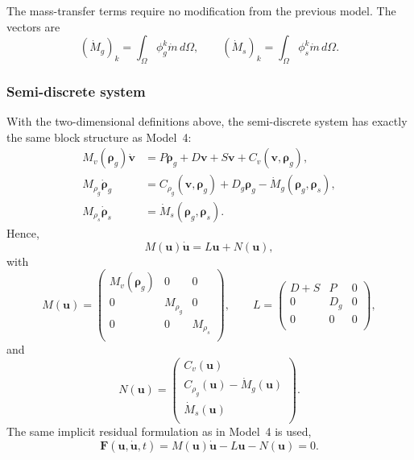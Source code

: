 The mass-transfer terms require no modification from the previous model. The vectors are
\begin{equation}
(\dot M_g)_{k}=\int_\Omega\phi_g^k\dot m\,d\Omega,\qquad
(\dot M_s)_{k}=\int_\Omega\phi_s^k\dot m\,d\Omega.
\end{equation}

\subsubsection{Semi-discrete system}

With the two-dimensional definitions above, the semi-discrete system has exactly the same block structure as Model~4:
\begin{subequations}\label{eq:model5_semidis}
\begin{align}
M_v(\boldsymbol\rho_g)\dot{\mathbf v}
&=P\boldsymbol\rho_g+D\mathbf v+S\mathbf v+C_v(\mathbf v,\boldsymbol\rho_g),\\
M_{\rho_g}\dot{\boldsymbol\rho}_g
&=C_{\rho_g}(\mathbf v,\boldsymbol\rho_g)+D_g\boldsymbol\rho_g-\dot M_g(\boldsymbol\rho_g,\boldsymbol\rho_s),\\
M_{\rho_s}\dot{\boldsymbol\rho}_s
&=\dot M_s(\boldsymbol\rho_g,\boldsymbol\rho_s).
\end{align}
\end{subequations}
Hence,
\begin{equation}
M(\mathbf u)\dot{\mathbf u}=L\mathbf u+N(\mathbf u),
\end{equation}
with
\begin{equation}
M(\mathbf u)=
\begin{pmatrix}
M_v(\boldsymbol\rho_g)&0&0\\
0&M_{\rho_g}&0\\
0&0&M_{\rho_s}\\
\end{pmatrix},
\qquad
L=
\begin{pmatrix}
D+S&P&0\\
0&D_g&0\\
0&0&0\\
\end{pmatrix},
\end{equation}
and
\begin{equation}
N(\mathbf u)=
\begin{pmatrix}
C_v(\mathbf u)\\
C_{\rho_g}(\mathbf u)-\dot M_g(\mathbf u)\\
\dot M_s(\mathbf u)\\
\end{pmatrix}.
\end{equation}
The same implicit residual formulation as in Model~4 is used,
\begin{equation}\label{eq:model5_residual}
\mathbf F(\mathbf u,\dot{\mathbf u},t)
=M(\mathbf u)\dot{\mathbf u}-L\mathbf u-N(\mathbf u)=0.
\end{equation}

